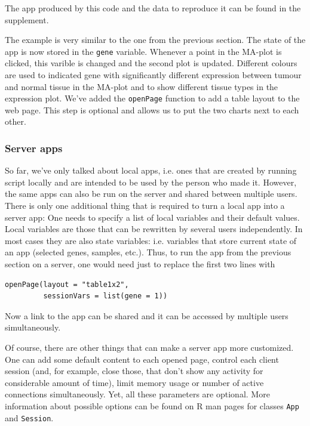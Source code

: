 \documentclass[twocolumn,10pt]{article}
\begin{document}
The app produced by this code and the data to reproduce it can be found in the supplement.

The example is very similar to the one from the previous section. The state of the app is now stored in the \texttt{gene} variable. Whenever a point in the MA-plot is clicked, this varible is changed and the second plot is updated. Different colours are used to indicated gene with significantly different expression between tumour and normal tissue in the MA-plot and to show different tissue types in the expression plot. We've added the \texttt{openPage} function to add a table layout to the web page. This step is optional and allows us to put the two charts next to each other.

\subsubsection{Server apps}

So far, we've only talked about local apps, i.e. ones that are created by running script locally and are intended to be used by the person who made it. However, the same apps can also be run on the server and shared between multiple users. There is only one additional thing that is required to turn a local app into a server app: One needs to specify a list of local variables and their default values. Local variables are those that can be rewritten by several users independently. In most cases they are also state variables: i.e. variables that store current state of an app (selected genes, samples, etc.). Thus, to run the app from the previous section on a server, one would need just to replace the first two lines with

\begin{verbatim}
openPage(layout = "table1x2", 
         sessionVars = list(gene = 1))
\end{verbatim}

Now a link to the app  can be shared and it can be accessed by multiple users simultaneously.

Of course, there are other things that can make a server app more customized. One can add some default content to each opened page, control each client session (and, for example, close those, that don't show any activity for considerable amount of time), limit memory usage or number of active connections simultaneously. Yet, all these parameters are optional. More information about possible options can be found on R man pages for classes \texttt{App} and \texttt{Session}.
\end{document}
